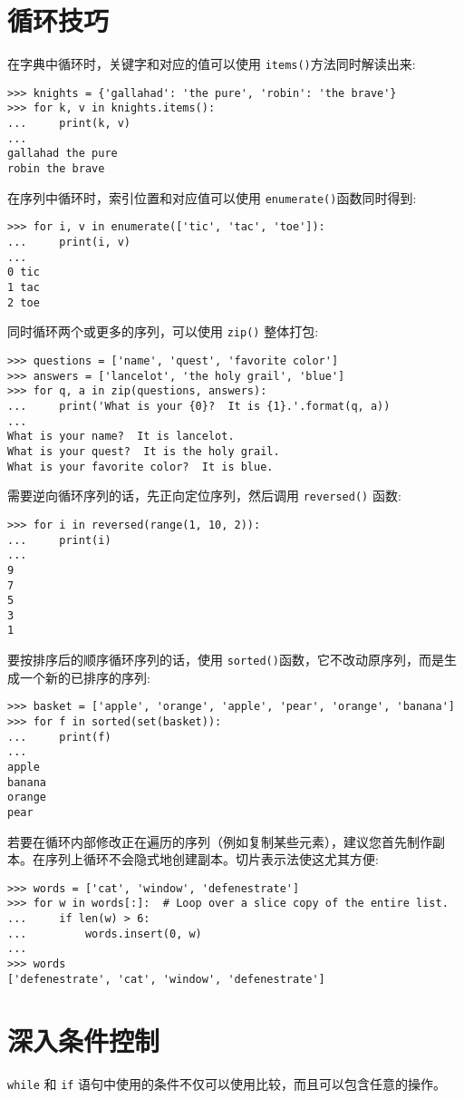 \section{循环技巧\label{DataStructures:LoopTech}}
在字典中循环时，关键字和对应的值可以使用 \texttt{items()}方法同时解读出来:
\begin{lstlisting}
>>> knights = {'gallahad': 'the pure', 'robin': 'the brave'}
>>> for k, v in knights.items():
...     print(k, v)
...
gallahad the pure
robin the brave
\end{lstlisting}
在序列中循环时，索引位置和对应值可以使用 \texttt{enumerate()}函数同时得到:
\begin{lstlisting}
>>> for i, v in enumerate(['tic', 'tac', 'toe']):
...     print(i, v)
...
0 tic
1 tac
2 toe
\end{lstlisting}
同时循环两个或更多的序列，可以使用 \texttt{zip()} 整体打包:
\begin{lstlisting}
>>> questions = ['name', 'quest', 'favorite color']
>>> answers = ['lancelot', 'the holy grail', 'blue']
>>> for q, a in zip(questions, answers):
...     print('What is your {0}?  It is {1}.'.format(q, a))
...
What is your name?  It is lancelot.
What is your quest?  It is the holy grail.
What is your favorite color?  It is blue.
\end{lstlisting}
需要逆向循环序列的话，先正向定位序列，然后调用 \texttt{reversed()} 函数:
\begin{lstlisting}
>>> for i in reversed(range(1, 10, 2)):
...     print(i)
...
9
7
5
3
1
\end{lstlisting}
要按排序后的顺序循环序列的话，使用 \texttt{sorted()}函数，它不改动原序列，而是生成一个新的已排序的序列:
\begin{lstlisting}
>>> basket = ['apple', 'orange', 'apple', 'pear', 'orange', 'banana']
>>> for f in sorted(set(basket)):
...     print(f)
...
apple
banana
orange
pear
\end{lstlisting}
若要在循环内部修改正在遍历的序列（例如复制某些元素），建议您首先制作副本。在序列上循环不会隐式地创建副本。切片表示法使这尤其方便:
\begin{lstlisting}
>>> words = ['cat', 'window', 'defenestrate']
>>> for w in words[:]:  # Loop over a slice copy of the entire list.
...     if len(w) > 6:
...         words.insert(0, w)
...
>>> words
['defenestrate', 'cat', 'window', 'defenestrate']
\end{lstlisting}
\section{深入条件控制}
\texttt{while} 和 \texttt{if} 语句中使用的条件不仅可以使用比较，而且可以包含任意的操作。

